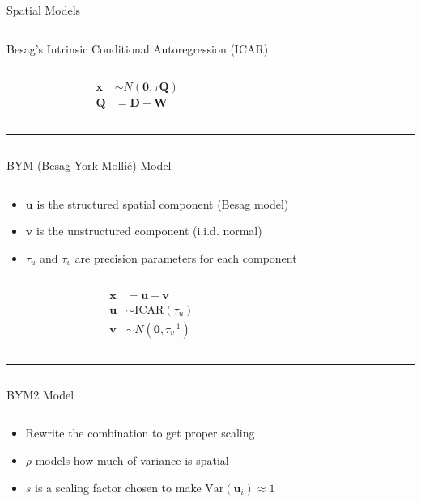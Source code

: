 \documentclass[
  ignorenonframetext,
]{beamer}
\providecommand{\tightlist}{%
  \setlength{\itemsep}{0pt}\setlength{\parskip}{0pt}}\usepackage{longtable,booktabs,array}
\begin{document}
\begin{frame}{Spatial Models}
\begin{columns}[T]
\begin{block}{Besag's Intrinsic Conditional Autoregression (ICAR)}
\begin{column}{0.5\textwidth}
\[
\begin{aligned}
\mathbf{x} &\sim N(\mathbf{0}, \tau \mathbf{Q}) \\
\mathbf{Q} &= \mathbf{D} - \mathbf{W}
\end{aligned}
\]
\end{column}
\end{block}
\end{columns}

\begin{center}\rule{0.5\linewidth}{0.5pt}\end{center}

\begin{columns}[T]
\begin{block}{BYM (Besag-York-Mollié) Model}
\label{bym-besag-york-molliuxe9-model}
\begin{column}{0.5\textwidth}
\begin{itemize}
\tightlist
\item
  \(\mathbf{u}\) is the structured spatial component (Besag model)
\item
  \(\mathbf{v}\) is the unstructured component (i.i.d. normal)
\item
  \(\tau_u\) and \(\tau_v\) are precision parameters for each component
\end{itemize}
\end{column}

\begin{column}{0.5\textwidth}
\[
\begin{aligned}
\mathbf{x} &= \mathbf{u} + \mathbf{v} \\
\mathbf{u} &\sim \mathrm{ICAR}(\tau_u) \\
\mathbf{v} &\sim N(\mathbf{0}, \tau_v^{-1})
\end{aligned}
\]
\end{column}
\end{block}
\end{columns}

\begin{center}\rule{0.5\linewidth}{0.5pt}\end{center}

\begin{columns}[T]
\begin{block}{BYM2 Model}
\label{bym2-model}
\begin{column}{0.5\textwidth}
\begin{itemize}
\tightlist
\item
  Rewrite the combination to get proper scaling
\item
  \(\rho\) models how much of variance is spatial
\item
  \(s\) is a scaling factor chosen to make
  \(\mathrm{Var}(\mathbf u_i) \approx 1\)
\end{itemize}
\end{column}


\end{block}
\end{columns}
\end{frame}
\end{document}
